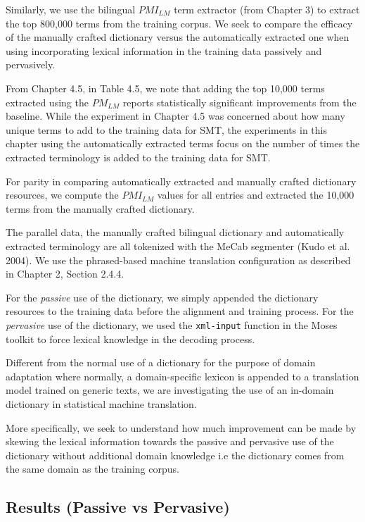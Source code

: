 Similarly, we use the bilingual $PMI_{LM}$ term extractor (from Chapter 3) to extract the top 800,000 terms from the training corpus. We seek to compare the efficacy of the manually crafted dictionary versus the automatically extracted one when using incorporating lexical information in the training data passively and pervasively. 

From Chapter 4.5, in Table 4.5, we note that adding the top 10,000 terms extracted using the $PM_{LM}$ reports statistically significant improvements from the baseline. While the experiment in Chapter 4.5 was concerned about how many unique terms to add to the training data for SMT, the experiments in this chapter using the automatically extracted terms focus on the number of times the extracted terminology is added to the training data for SMT. 

For parity in comparing automatically extracted and manually crafted dictionary resources, we compute the $PMI_{LM}$ values for all entries and extracted the 10,000 terms from the manually crafted dictionary. 

The parallel data, the manually crafted bilingual dictionary and automatically extracted terminology are all tokenized with the MeCab segmenter (Kudo et al. 2004). We use the phrased-based machine translation configuration as described in Chapter 2, Section 2.4.4. 

For the \textit{passive} use of the dictionary, we simply appended the dictionary resources to the training data before the alignment and training process. For the \textit{pervasive} use of the dictionary, we used the {\tt xml-input} function in the Moses toolkit to force lexical knowledge in the decoding process.

Different from the normal use of a dictionary for the purpose of domain adaptation where normally, a domain-specific lexicon is appended to a translation model trained on generic texts, we are investigating the use of an in-domain dictionary in statistical machine translation.

More specifically, we seek to understand how much improvement can be made by skewing the lexical information towards the passive and pervasive use of the dictionary without additional domain knowledge i.e the dictionary comes from the same domain as the training corpus.

\subsection{Results (Passive vs Pervasive)}

